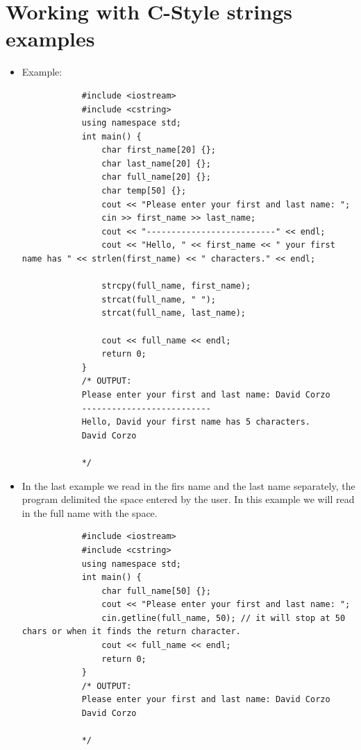 \section{Working with C-Style strings examples}
\begin{itemize}
    \item Example:
        \begin{verbatim}
            #include <iostream>
            #include <cstring>
            using namespace std;
            int main() {
                char first_name[20] {};
                char last_name[20] {};
                char full_name[20] {};
                char temp[50] {};
                cout << "Please enter your first and last name: ";
                cin >> first_name >> last_name;
                cout << "--------------------------" << endl;
                cout << "Hello, " << first_name << " your first name has " << strlen(first_name) << " characters." << endl;

                strcpy(full_name, first_name);
                strcat(full_name, " ");
                strcat(full_name, last_name);

                cout << full_name << endl; 
                return 0;
            }
            /* OUTPUT:
            Please enter your first and last name: David Corzo
            --------------------------
            Hello, David your first name has 5 characters.
            David Corzo

            */
        \end{verbatim}
    
    \item In the last example we read in the firs name and the last name separately, the program delimited the space entered by the user. In this example we will read in the full name with the space.
        \begin{verbatim}
            #include <iostream>
            #include <cstring>
            using namespace std;
            int main() {
                char full_name[50] {};
                cout << "Please enter your first and last name: ";
                cin.getline(full_name, 50); // it will stop at 50 chars or when it finds the return character.
                cout << full_name << endl;
                return 0;
            }
            /* OUTPUT:
            Please enter your first and last name: David Corzo
            David Corzo

            */
        \end{verbatim}
    

\end{itemize}
